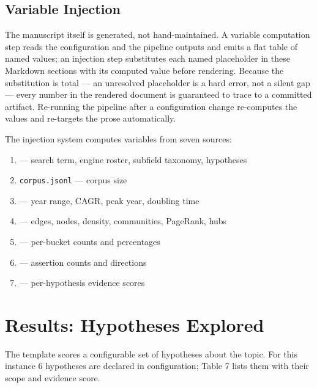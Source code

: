 \documentclass[
  english,
]{article}
\providecommand{\tightlist}{%
  \setlength{\itemsep}{0pt}\setlength{\parskip}{0pt}}
\begin{document}
\subsection{Variable Injection}\label{variable-injection}

The manuscript itself is generated, not hand-maintained. A variable
computation step reads the configuration and the pipeline outputs and
emits a flat table of named values; an injection step substitutes each
named placeholder in these Markdown sections with its computed value
before rendering. Because the substitution is total --- an unresolved
placeholder is a hard error, not a silent gap --- every number in the
rendered document is guaranteed to trace to a committed artifact.
Re-running the pipeline after a configuration change re-computes the
values and re-targets the prose automatically.

The injection system computes variables from seven sources:

\begin{enumerate}
\def\labelenumi{\arabic{enumi}.}
\tightlist
\item
   --- search term, engine roster,
  subfield taxonomy, hypotheses
\item
  \texttt{corpus.jsonl} --- corpus size
\item
   --- year range, CAGR, peak year,
  doubling time
\item
   --- edges, nodes, density,
  communities, PageRank, hubs
\item
   --- per-bucket counts and
  percentages
\item
   --- assertion counts and directions
\item
   --- per-hypothesis evidence scores
\end{enumerate}

\newpage

\section{Results: Hypotheses
Explored}\label{results-hypotheses-explored}

The template scores a configurable set of hypotheses about the topic.
For this instance 6 hypotheses are declared in configuration; Table 7
lists them with their scope and evidence score.
\end{document}
